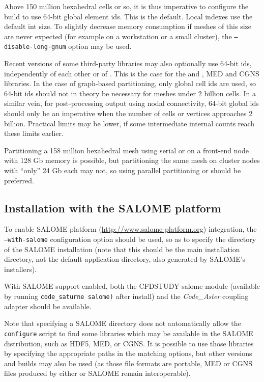 \documentclass[a4paper,10pt,twoside]{csshortdoc}
\begin{document}
Above 150 million hexahedral cells or so, it is thus imperative to configure
the build to use 64-bit global element ids. This is the default.
Local indexes use the default {int} size. To slightly decrease memory
consumption if meshes of this size are never expected (for example on a workstation
or a small cluster), the {\tt --disable-long-gnum} option may be used.

Recent versions of some third-party libraries may also optionally use 64-bit ids,
independently of each other or of \CS.
This is the case for the \scotch and \metis, MED and
CGNS libraries. In the case of graph-based partitioning, only
global cell ids are used, so 64-bit ids should not in theory be necessary
for meshes under 2 billion cells. In a similar vein, for post-processing output
using nodal connectivity, 64-bit global ids should only be an imperative
when the number of cells or vertices approaches 2 billion.
Practical limits may be lower, if some intermediate internal counts
reach these limits earlier.

Partitioning a 158 million hexahedral mesh using serial  or \scotch
on a front-end node with 128 Gb memory is possible,
but partitioning the same mesh on cluster nodes with ``only'' 24 Gb each
may not, so using parallel partitioning \ptscotch or \parmetis
should be preferred.

\subsection{Installation with the SALOME platform\label{sec:config:salome}}

To enable SALOME platform (\url{http://www.salome-platform.org}) integration,
the \texttt{--with-salome} configuration option should be used, so as to
specify the directory of the SALOME installation (note that this should be
the main installation directory, not the default application directory,
also generated by SALOME's installers).

With SALOME support enabled, both the CFDSTUDY salome module
(available by running \texttt{code\_saturne salome)} after install)
and the \textit{Code\_Aster} coupling adapter should be available.

Note that specifying a SALOME directory does not automatically
allow the \CS \texttt{configure} script to find some libraries
which may be available in the SALOME distribution, such as HDF5,
MED, or CGNS. It is possible to use those libraries by specifying
the appropriate paths in the matching options, but other versions and builds
may also be used (as those file formats are portable, MED or CGNS files produced
by either \CS or SALOME remain interoperable).
\end{document}
